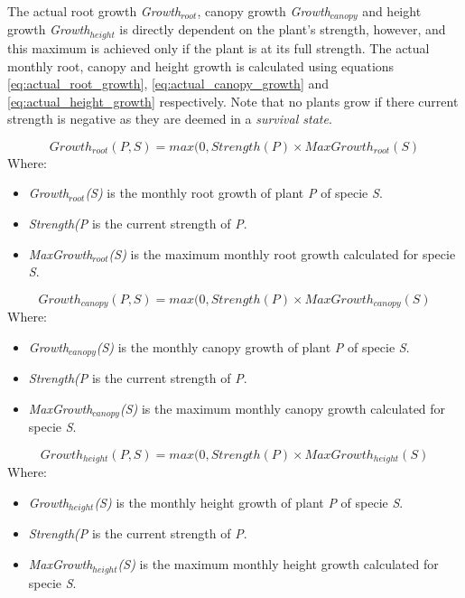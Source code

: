 The actual root growth \textit{Growth$_{root}$}, canopy growth \textit{Growth$_{canopy}$} and height growth \textit{Growth$_{height}$} is directly dependent on the plant's strength, however, and this maximum is achieved only if the plant is at its full strength. The actual monthly root, canopy and height growth is calculated using equations \ref{eq:actual_root_growth}, \ref{eq:actual_canopy_growth} and \ref{eq:actual_height_growth} respectively. Note that no plants grow if there current strength is negative as they are deemed in a \textit{survival state}.

\begin{equation}
Growth_{root}(\textit{P},S) = max(0, Strength(\textit{P}) \times  MaxGrowth_{root}(S)
\label{eq:actual_root_growth}
\end{equation}
Where:
\begin{itemize}
\item \textit{Growth$_{root}$(S)} is the monthly root growth of plant \textit{P} of specie \textit{S}.
\item \textit{Strength(\textit{P}} is the current strength of \textit{P}.
\item \textit{MaxGrowth$_{root}$(S)} is the maximum monthly root growth calculated for specie \textit{S}.
\end{itemize}

\begin{equation}
Growth_{canopy}(\textit{P},S) = max(0, Strength(\textit{P}) \times  MaxGrowth_{canopy}(S)
\label{eq:actual_canopy_growth}
\end{equation}
Where:
\begin{itemize}
\item \textit{Growth$_{canopy}$(S)} is the monthly canopy growth of plant \textit{P} of specie \textit{S}.
\item \textit{Strength(\textit{P}} is the current strength of \textit{P}.
\item \textit{MaxGrowth$_{canopy}$(S)} is the maximum monthly canopy growth calculated for specie \textit{S}.
\end{itemize}

\begin{equation}
Growth_{height}(\textit{P},S) = max(0, Strength(\textit{P}) \times  MaxGrowth_{height}(S)
\label{eq:actual_height_growth}
\end{equation}
Where:
\begin{itemize}
\item \textit{Growth$_{height}$(S)} is the monthly height growth of plant \textit{P} of specie \textit{S}.
\item \textit{Strength(\textit{P}} is the current strength of \textit{P}.
\item \textit{MaxGrowth$_{height}$(S)} is the maximum monthly height growth calculated for specie \textit{S}.
\end{itemize}

